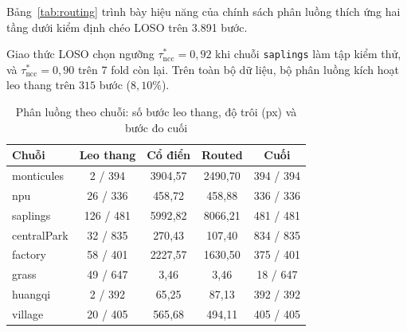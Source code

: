 \documentclass[conference]{IEEEtran}
\begin{document}
Bảng~\ref{tab:routing} trình bày hiệu năng của chính sách phân luồng thích ứng hai tầng dưới kiểm định chéo LOSO trên 3.891 bước.

\begin{table}[h]
\centering
\caption{Hiệu năng phân luồng thích ứng dưới kiểm định chéo LOSO (3.891 bước)}
\label{tab:routing}
\footnotesize

\end{table}

Giao thức LOSO chọn ngưỡng $\tau_{\mathrm{ncc}}^* = 0{,}92$ khi chuỗi \texttt{saplings} làm tập kiểm thử, và $\tau_{\mathrm{ncc}}^* = 0{,}90$ trên 7 fold còn lại. Trên toàn bộ dữ liệu, bộ phân luồng kích hoạt leo thang trên $315$ bước ($8{,}10\%$).

\begin{table}[t]
\centering
\caption{Phân luồng theo chuỗi: số bước leo thang, độ trôi (px) và bước đo cuối}
\label{tab:routing_breakdown}
\footnotesize
\begin{tabular}{@{}lcccc@{}}
\toprule
Chuỗi & Leo thang & Cổ điển & Routed & Cuối \\
\midrule
monticules & 2 / 394 & 3904{,}57 & 2490{,}70 & 394 / 394 \\
npu & 26 / 336 & 458{,}72 & 458{,}88 & 336 / 336 \\
saplings & 126 / 481 & 5992{,}82 & 8066{,}21 & 481 / 481 \\
centralPark & 32 / 835 & 270{,}43 & 107{,}40 & 834 / 835 \\
factory & 58 / 401 & 2227{,}57 & 1630{,}50 & 375 / 401 \\
grass & 49 / 647 & 3{,}46 & 3{,}46 & 18 / 647 \\
huangqi & 2 / 392 & 65{,}25 & 87{,}13 & 392 / 392 \\
village & 20 / 405 & 565{,}68 & 494{,}11 & 405 / 405 \\
\bottomrule
\end{tabular}
\end{table}
\end{document}
